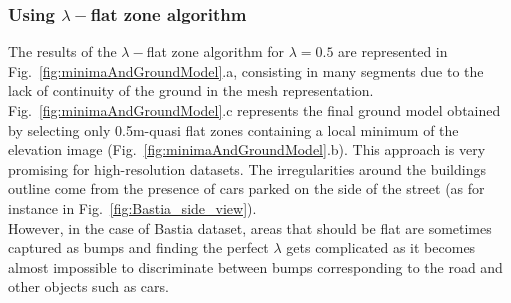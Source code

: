 \documentclass{kththesis}
\begin{document}
\subsubsection{Using $\lambda-$flat zone algorithm}
The results of the $\lambda-$flat zone algorithm for $\lambda = 0.5$ are represented in Fig.~\ref{fig:minimaAndGroundModel}.a, consisting in many segments due to the lack of continuity of the ground in the mesh representation. Fig.~\ref{fig:minimaAndGroundModel}.c represents the final ground model obtained by selecting only 0.5m-quasi flat zones containing a local minimum of the elevation image (Fig.~\ref{fig:minimaAndGroundModel}.b). This approach is very promising for high-resolution datasets. The irregularities around the buildings outline come from the presence of cars parked on the side of the street (as for instance in Fig.~\ref{fig:Bastia_side_view}). \\
However, in the case of Bastia dataset, areas that should be flat are sometimes captured as bumps and finding the perfect $\lambda$ gets complicated as it becomes almost impossible to discriminate between bumps corresponding to the road and other objects such as cars. 
\end{document}
